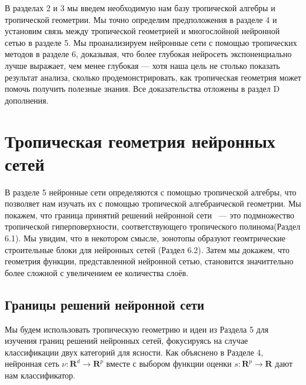 \documentclass[russian]{lecture-notes}
\begin{document}
	В разделах 2 и 3 мы введем необходимую нам базу тропической алгебры и тропической геометрии. Мы точно определим предположения в разделе 4 и установим связь между тропической геометрией и многослойной нейронной сетью в разделе 5. Мы проанализируем нейронные сети с помощью тропических методов в разделе 6, доказывая, что более глубокая нейросеть экспоненциально лучше выражает, чем менее глубокая --- хотя наша цель не столько показать результат анализа, сколько продемонстрировать, как тропическая геометрия может помочь получить полезные знания. Все доказательства отложены в раздел D дополнения.
	
	\section{Тропическая геометрия нейронных сетей}
	
	В разделе 5 нейронные сети определяются с помощью тропической алгебры, что позволяет нам изучать их с помощью тропической алгебраической геометрии. Мы покажем, что граница принятий решений нейронной сети ~--- это подмножество тропической гиперповерхности, соответствующего тропического полинома(Раздел 6.1). Мы увидим, что в некотором смысле, зонотопы образуют геомтрические строительные блоки для нейронных сетей (Раздел 6.2). Затем мы докажем, что геометрия функции, представленной нейронной сетью, становится значиттельно более сложной с увеличением ее количества слоёв.
	\subsection{Границы решений нейронной сети}
	
	Мы будем использовать тропическую геометрию и идеи из Раздела 5 для изучения границ решений нейронных сетей, фокусируясь на случае классификации двух категорий для ясности. Как объяснено в Разделе 4, нейронная сеть $\nu : \mathbf{R}^d \rightarrow \mathbf{R}^p$ вместе с выбором функции оценки $s: \mathbf{R}^p \rightarrow \mathbf{R}$ дают нам классификатор. 
\end{document}
